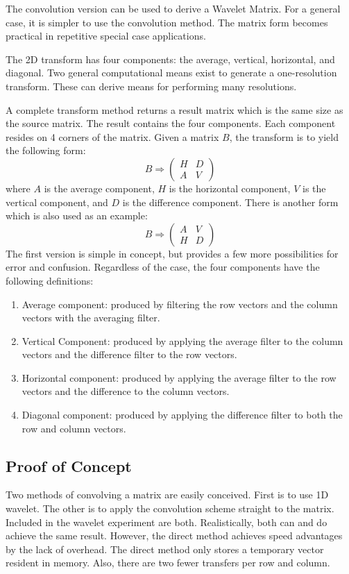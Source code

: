 The convolution version can be used to derive a Wavelet Matrix.  For a
general case, it is simpler to use the convolution method.  The matrix
form becomes practical in repetitive special case applications.

The 2D transform has four components: the average, vertical,
horizontal, and diagonal. Two general computational means exist to
generate a one-resolution transform.  These can derive means for
performing many resolutions.

A complete transform method returns a result matrix which is the same
size as the source matrix. The result contains the four
components. Each component resides on 4 corners of the matrix. Given a
matrix $B$, the transform is to yield the following form:
\[ 
B \Rightarrow 
\left(
\begin{array}{cc}
H & D \\ 
A & V
\end{array}
\right)
\]
where $A$ is the average component, $H$ is the horizontal component,
$V$ is the vertical component, and $D$ is the difference
component. There is another form which is also used as an example:
\[
B \Rightarrow 
\left(
\begin{array}{cc}
A & V \\ 
H & D
\end{array}
\right)
\]
The first version is simple in concept, but provides a few more
possibilities for error and confusion.  Regardless of the case, the
four components have the following definitions:
\begin{enumerate}
\item Average component: produced by filtering the row vectors and the column vectors with the averaging filter.
\item Vertical Component:  produced by applying the average filter to the column vectors and the difference filter to the row vectors.
\item Horizontal component: produced by applying the average filter to the row vectors and the difference to the column vectors.
\item Diagonal component: produced by applying the difference filter to both the row and column vectors.  
\end{enumerate}

\subsection{Proof of Concept}
Two methods of convolving a matrix are easily conceived.  First is to
use 1D wavelet.  The other is to apply the convolution scheme
straight to the matrix. Included in the wavelet experiment are both.
Realistically, both can and do achieve the same result.  However, the
direct method achieves speed advantages by the lack of overhead.  The
direct method only stores a temporary vector resident in memory.  Also,
there are two fewer transfers per row and column.

